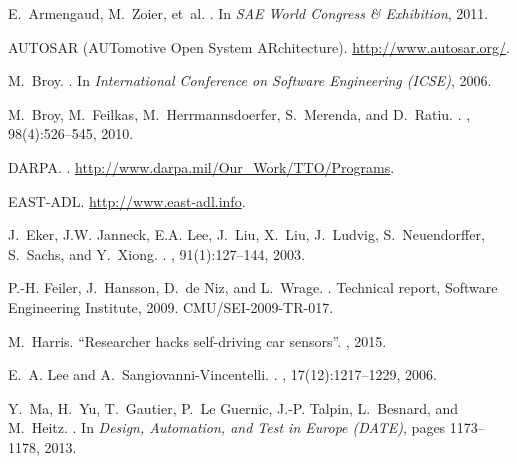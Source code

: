 
\begin{thebibliography}{10}

E.~Armengaud, M.~Zoier, et~al.
.
\newblock In {\em SAE World Congress \& Exhibition}, 2011.

{AUTOSAR (AUTomotive Open System ARchitecture)}.
\newblock \url{http://www.autosar.org/}.

M.~Broy.
.
\newblock In {\em International Conference on Software Engineering (ICSE)},
  2006.

M.~Broy, M.~Feilkas, M.~Herrmannsdoerfer, S.~Merenda, and D.~Ratiu.
.
, 98(4):526--545, 2010.

DARPA.
.
\newblock \url{http://www.darpa.mil/Our\_Work/TTO/Programs}.

{EAST-ADL}.
\newblock \url{http://www.east-adl.info}.

J.~Eker, J.W. Janneck, E.A. Lee, J.~Liu, X.~Liu, J.~Ludvig, S.~Neuendorffer,
  S.~Sachs, and Y.~Xiong.
.
, 91(1):127--144, 2003.

P.-H. Feiler, J.~Hansson, D.~{de Niz}, and L.~Wrage.
.
\newblock Technical report, Software Engineering Institute, 2009.
\newblock CMU/SEI-2009-TR-017.

M.~Harris.
\newblock ``Researcher hacks self-driving car sensors''.
, 2015.

E.~A. Lee and A.~Sangiovanni-Vincentelli.
.
, 17(12):1217--1229, 2006.

Y.~Ma, H.~Yu, T.~Gautier, P.~{Le Guernic}, J.-P. Talpin, L.~Besnard, and
  M.~Heitz.
.
\newblock In {\em Design, Automation, and Test in Europe (DATE)}, pages
  1173--1178, 2013.


\end{thebibliography}
